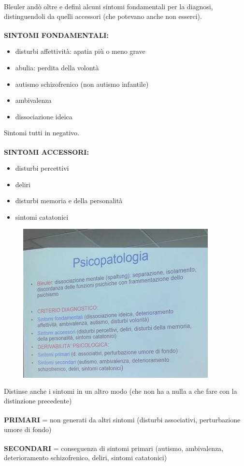 Bleuler andò oltre e definì alcuni sintomi fondamentali per la diagnosi,
distinguendoli da quelli accessori (che potevano anche non esserci).
\\\\
\textbf{SINTOMI FONDAMENTALI:}

\begin{itemize}
\item
  disturbi affettività: apatia più o meno grave
\item
  abulia: perdita della volontà
\item
  autismo schizofrenico (non autismo infantile)
\item
  ambivalenza
\item
  dissociazione ideica
\end{itemize}

Sintomi tutti in negativo.
\\\\
\textbf{SINTOMI ACCESSORI:}
\begin{itemize}
\item disturbi percettivi
\item deliri
\item disturbi memoria e della personalità
\item sintomi catatonici
\end{itemize}

\begin{figure}[!ht]
\centering
	\includegraphics[width=0.9\textwidth]{06/image2.jpeg}
\end{figure}

Distinse anche i sintomi in un altro modo (che non ha a nulla a che fare
con la distinzione precedente)
\\\\
\textbf{PRIMARI} = non generati da altri sintomi (disturbi associativi,
perturbazione umore di fondo)
\\\\
\textbf{SECONDARI} = conseguenza di sintomi primari (autismo,
ambivalenza, deterioramento schizofrenico, deliri, sintomi catatonici)

